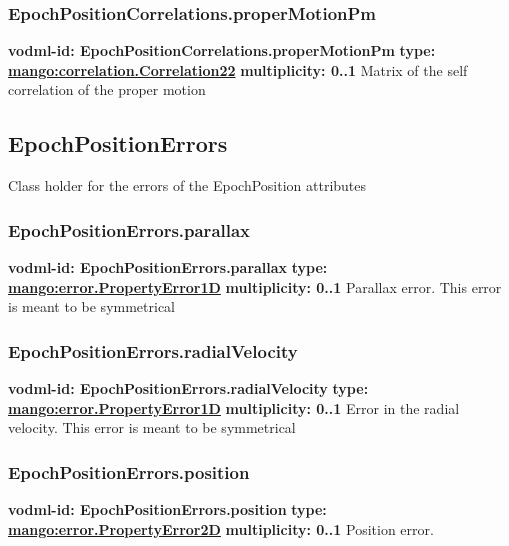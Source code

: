     \subsubsection{EpochPositionCorrelations.properMotionPm}
      \textbf{vodml-id: EpochPositionCorrelations.properMotionPm} \newline
      \textbf{type: \hyperref[sect:correlation.Correlation22]{mango:correlation.Correlation22}} \newline
      \textbf{multiplicity: 0..1} \newline 
      Matrix of the self correlation of the proper motion

  \subsection{EpochPositionErrors}
  \label{sect:EpochPositionErrors}
    Class holder for the errors of the EpochPosition attributes

    \subsubsection{EpochPositionErrors.parallax}
      \textbf{vodml-id: EpochPositionErrors.parallax} \newline
      \textbf{type: \hyperref[sect:error.PropertyError1D]{mango:error.PropertyError1D}} \newline
      \textbf{multiplicity: 0..1} \newline 
      Parallax error. This error is meant to be symmetrical

    \subsubsection{EpochPositionErrors.radialVelocity}
      \textbf{vodml-id: EpochPositionErrors.radialVelocity} \newline
      \textbf{type: \hyperref[sect:error.PropertyError1D]{mango:error.PropertyError1D}} \newline
      \textbf{multiplicity: 0..1} \newline 
      Error in the radial velocity. This error is meant to be symmetrical

    \subsubsection{EpochPositionErrors.position}
      \textbf{vodml-id: EpochPositionErrors.position} \newline
      \textbf{type: \hyperref[sect:error.PropertyError2D]{mango:error.PropertyError2D}} \newline
      \textbf{multiplicity: 0..1} \newline 
      Position error.

